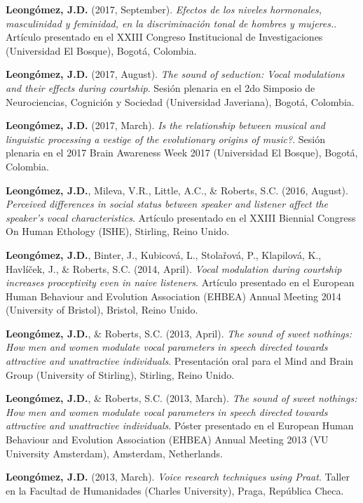 \documentclass[11pt, a4paper]{awesome-cv}
\begin{document}
\textbf{Leongómez, J.D.} (2017, September). \emph{Efectos de los niveles hormonales, masculinidad y feminidad, en la discriminación tonal de hombres y mujeres.}. Artículo presentado en el XXIII Congreso Institucional de Investigaciones (Universidad El Bosque), Bogotá, Colombia.

\textbf{Leongómez, J.D.} (2017, August). \emph{The sound of seduction: Vocal modulations and their effects during courtship}. Sesión plenaria en el 2do Simposio de Neurociencias, Cognición y Sociedad (Universidad Javeriana), Bogotá, Colombia.

\textbf{Leongómez, J.D.} (2017, March). \emph{Is the relationship between musical and linguistic processing a vestige of the evolutionary origins of music?}. Sesión plenaria en el 2017 Brain Awareness Week 2017 (Universidad El Bosque), Bogotá, Colombia.

\textbf{Leongómez, J.D.}, Mileva, V.R., Little, A.C., \& Roberts, S.C. (2016, August). \emph{Perceived differences in social status between speaker and listener affect the speaker's vocal characteristics}. Artículo presentado en el XXIII Biennial Congress On Human Ethology (ISHE), Stirling, Reino Unido.

\textbf{Leongómez, J.D.}, Binter, J., Kubicová, L., Stolařová, P., Klapilová, K., Havlíček, J., \& Roberts, S.C. (2014, April). \emph{Vocal modulation during courtship increases proceptivity even in naive listeners}. Artículo presentado en el European Human Behaviour and Evolution Association (EHBEA) Annual Meeting 2014 (University of Bristol), Bristol, Reino Unido.

\textbf{Leongómez, J.D.}, \& Roberts, S.C. (2013, April). \emph{The sound of sweet nothings: How men and women modulate vocal parameters in speech directed towards attractive and unattractive individuals}. Presentación oral para el Mind and Brain Group (University of Stirling), Stirling, Reino Unido.

\textbf{Leongómez, J.D.}, \& Roberts, S.C. (2013, March). \emph{The sound of sweet nothings: How men and women modulate vocal parameters in speech directed towards attractive and unattractive individuals}. Póster presentado en el European Human Behaviour and Evolution Association (EHBEA) Annual Meeting 2013 (VU University Amsterdam), Amsterdam, Netherlands.

\textbf{Leongómez, J.D.} (2013, March). \emph{Voice research techniques using Praat}. Taller en la Facultad de Humanidades (Charles University), Praga, República Checa.
\end{document}
